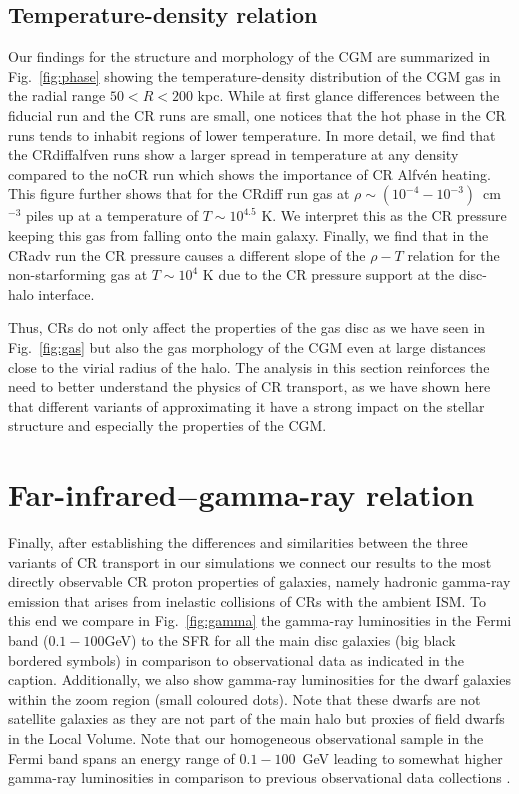 \documentclass[useAMS,usenatbib]{mnras}
\begin{document}
\subsection{Temperature-density relation}
Our findings for the structure and morphology of the CGM are summarized in Fig.\ \ref{fig:phase} showing the temperature-density distribution of the CGM gas in the radial range $50<R<200$ kpc. While at first glance differences between the fiducial run and the CR runs are small, one notices that the hot phase in the CR runs tends to inhabit regions of lower temperature. In more detail, we find that the CRdiffalfven runs show a larger spread in temperature at any density compared to the noCR run which shows the importance of CR Alfv\'en heating. This figure further shows that for the CRdiff run gas at $\rho\sim(10^{-4} - 10^{-3})$~cm$^{-3}$  piles up at a temperature of $T\sim10^{4.5}$ K. We interpret this as the CR pressure keeping this gas from falling onto the main galaxy. Finally, we find that in the CRadv run the CR pressure causes a different slope of the $\rho-T$ relation for the non-starforming gas at $T\sim10^{4}$ K due to the CR pressure support at the disc-halo interface.

Thus, CRs do not only affect the properties of the gas disc as we have seen in Fig.\ \ref{fig:gas} but also the gas morphology of the CGM even at large distances close to the virial radius of the halo. The analysis in this section reinforces the need to better understand the physics of CR transport, as we have shown here that different variants of approximating it have a strong impact on the stellar structure and especially the properties of the CGM.

\section{Far-infrared$-$gamma-ray relation}
\label{sec:obs}


Finally, after establishing the differences and similarities between the three variants of CR transport in our simulations we connect our results to the most directly observable CR proton properties of galaxies, namely hadronic gamma-ray emission that arises from inelastic collisions of CRs with the ambient ISM. To this end we compare in Fig.\ \ref{fig:gamma} the gamma-ray luminosities in the Fermi band ($0.1-100$GeV) to the SFR for all the main disc galaxies (big black bordered symbols) in comparison to observational data as indicated in the caption. Additionally, we also show gamma-ray luminosities for the dwarf galaxies within the zoom region (small coloured dots). Note that these dwarfs are not satellite galaxies as they are not part of the main halo but proxies of field dwarfs in the Local Volume. Note that our homogeneous observational sample in the Fermi band spans an energy range of $0.1-100$~GeV leading to somewhat higher gamma-ray luminosities in comparison to previous observational data collections \citep[cf.][who use the smaller energy band between $1-100$~GeV]{Lacki2011}.
\end{document}
